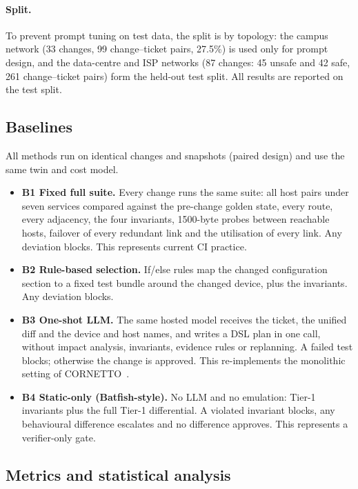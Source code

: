 \documentclass[pdflatex,iicol,sn-mathphys-num]{sn-jnl}%
\theoremstyle{thmstyletwo}%
\begin{document}
\paragraph{Split.} To prevent prompt tuning on test data, the split is by topology: the campus network (33 changes, 99 change--ticket pairs, 27.5\%) is used only for prompt design, and the data-centre and ISP networks (87 changes: 45 unsafe and 42 safe, 261 change--ticket pairs) form the held-out test split. All results are reported on the test split.

\subsection{Baselines}\label{sec:baselines}

All methods run on identical changes and snapshots (paired design) and use the same twin and cost model.
\begin{itemize}
\item \textbf{B1 Fixed full suite.} Every change runs the same suite: all host pairs under seven services compared against the pre-change golden state, every route, every adjacency, the four invariants, 1500-byte probes between reachable hosts, failover of every redundant link and the utilisation of every link. Any deviation blocks. This represents current CI practice.
\item \textbf{B2 Rule-based selection.} If/else rules map the changed configuration section to a fixed test bundle around the changed device, plus the invariants. Any deviation blocks.
\item \textbf{B3 One-shot LLM.} The same hosted model receives the ticket, the unified diff and the device and host names, and writes a DSL plan in one call, without impact analysis, invariants, evidence rules or replanning. A failed test blocks; otherwise the change is approved. This re-implements the monolithic setting of CORNETTO~\cite{asadli2026cornetto}.
\item \textbf{B4 Static-only (Batfish-style).} No LLM and no emulation: Tier-1 invariants plus the full Tier-1 differential. A violated invariant blocks, any behavioural difference escalates and no difference approves. This represents a verifier-only gate.
\end{itemize}

\subsection{Metrics and statistical analysis}\label{sec:metrics}
\end{document}
